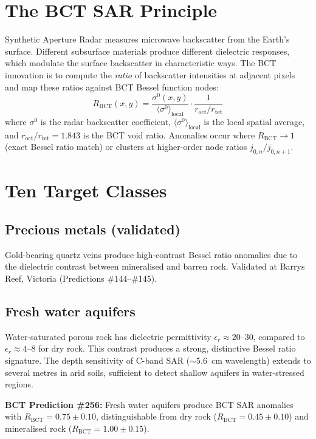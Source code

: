 \documentclass[aps,prl,twocolumn,superscriptaddress]{revtex4-2}
\begin{document}
\section{The BCT SAR Principle}

Synthetic Aperture Radar measures microwave backscatter from the Earth's surface. Different subsurface materials produce different dielectric responses, which modulate the surface backscatter in characteristic ways. The BCT innovation is to compute the \emph{ratio} of backscatter intensities at adjacent pixels and map these ratios against BCT Bessel function nodes:
\begin{equation}
R_{\mathrm{BCT}}(x,y) = \frac{\sigma^0(x,y)}{\langle \sigma^0 \rangle_{\mathrm{local}}} \cdot \frac{1}{r_{\mathrm{oct}}/r_{\mathrm{tet}}}
\end{equation}
where $\sigma^0$ is the radar backscatter coefficient, $\langle \sigma^0 \rangle_{\mathrm{local}}$ is the local spatial average, and $r_{\mathrm{oct}}/r_{\mathrm{tet}} = 1.843$ is the BCT void ratio. Anomalies occur where $R_{\mathrm{BCT}} \to 1$ (exact Bessel ratio match) or clusters at higher-order node ratios $j_{0,n}/j_{0,n+1}$.

\section{Ten Target Classes}

\subsection{Precious metals (validated)}
Gold-bearing quartz veins produce high-contrast Bessel ratio anomalies due to the dielectric contrast between mineralised and barren rock. Validated at Barrys Reef, Victoria (Predictions \#144--\#145).

\subsection{Fresh water aquifers}
Water-saturated porous rock has dielectric permittivity $\epsilon_r \approx 20$--$30$, compared to $\epsilon_r \approx 4$--$8$ for dry rock. This contrast produces a strong, distinctive Bessel ratio signature. The depth sensitivity of C-band SAR ($\sim$5.6~cm wavelength) extends to several metres in arid soils, sufficient to detect shallow aquifers in water-stressed regions.

\textbf{BCT Prediction \#256:} Fresh water aquifers produce BCT SAR anomalies with $R_{\mathrm{BCT}} = 0.75 \pm 0.10$, distinguishable from dry rock ($R_{\mathrm{BCT}} = 0.45 \pm 0.10$) and mineralised rock ($R_{\mathrm{BCT}} = 1.00 \pm 0.15$).
\end{document}
